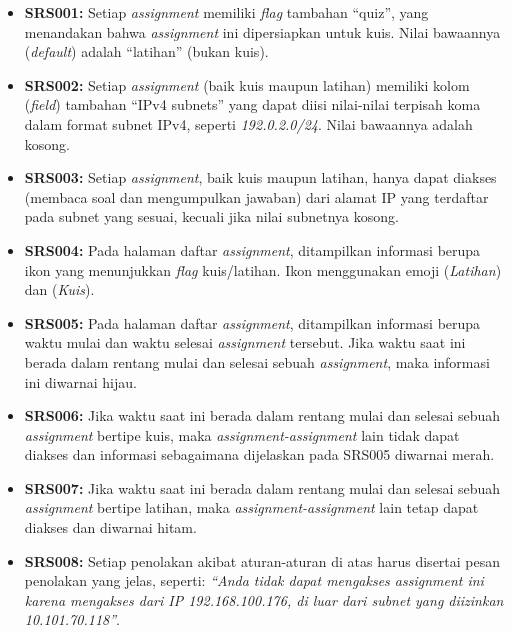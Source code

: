 \begin{itemize}
    \item \textbf{SRS001:} Setiap \textit{assignment} memiliki \textit{flag} tambahan ``quiz'', yang menandakan bahwa \textit{assignment} ini dipersiapkan untuk kuis. Nilai bawaannya (\textit{default}) adalah ``latihan'' (bukan kuis).
    
    \item \textbf{SRS002:} Setiap \textit{assignment} (baik kuis maupun latihan) memiliki kolom (\textit{field}) tambahan ``IPv4 subnets'' yang dapat diisi nilai-nilai terpisah koma dalam format subnet IPv4, seperti \textit{192.0.2.0/24}. Nilai bawaannya adalah kosong.
    
    \item \textbf{SRS003:} Setiap \textit{assignment}, baik kuis maupun latihan, hanya dapat diakses (membaca soal dan mengumpulkan jawaban) dari alamat IP yang terdaftar pada subnet yang sesuai, kecuali jika nilai subnetnya kosong.
    
    \item \textbf{SRS004:} Pada halaman daftar \textit{assignment}, ditampilkan informasi berupa ikon yang menunjukkan \textit{flag} kuis/latihan. Ikon menggunakan emoji  (\textit{Latihan}) dan  (\textit{Kuis}).
    
    \item \textbf{SRS005:} Pada halaman daftar \textit{assignment}, ditampilkan informasi berupa waktu mulai dan waktu selesai \textit{assignment} tersebut. Jika waktu saat ini berada dalam rentang mulai dan selesai sebuah \textit{assignment}, maka informasi ini diwarnai hijau.
    
    \item \textbf{SRS006:} Jika waktu saat ini berada dalam rentang mulai dan selesai sebuah \textit{assignment} bertipe kuis, maka \textit{assignment-assignment} lain tidak dapat diakses dan informasi sebagaimana dijelaskan pada SRS005 diwarnai merah.
    
    \item \textbf{SRS007:} Jika waktu saat ini berada dalam rentang mulai dan selesai sebuah \textit{assignment} bertipe latihan, maka \textit{assignment-assignment} lain tetap dapat diakses dan diwarnai hitam.
    
    \item \textbf{SRS008:} Setiap penolakan akibat aturan-aturan di atas harus disertai pesan penolakan yang jelas, seperti: \textit{``Anda tidak dapat mengakses assignment ini karena mengakses dari IP 192.168.100.176, di luar dari subnet yang diizinkan 10.101.70.118''}.
    

\end{itemize}
